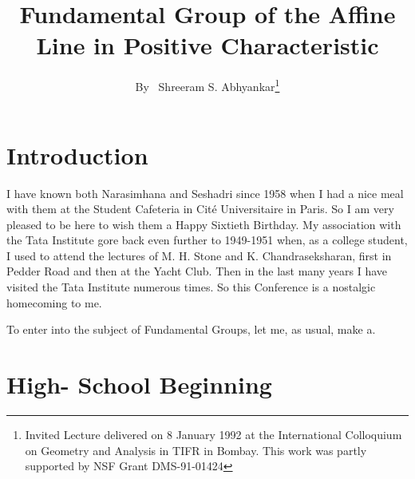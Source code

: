 \title{Fundamental Group of the Affine Line in Positive Characteristic}

\author{By~ Shreeram S. Abhyankar\footnote{Invited Lecture delivered on 8 January 1992 at the International Colloquium on Geometry and Analysis in TIFR in Bombay. This work was partly supported by NSF Grant DMS-91-01424}}

\date{}
\maketitle

\section{Introduction}\pageoriginale

I have known both Narasimhana and Seshadri since 1958 when I had a nice meal with them at the Student Cafeteria in Cit\'e Universitaire in Paris. So I am very pleased to be here to wish them a Happy Sixtieth Birthday. My association with the Tata Institute gore back even further to 1949-1951 when, as a college student, I used to attend the lectures of M. H. Stone and K. Chandraseksharan, first in Pedder Road and then at the Yacht Club. Then in the last many years I have visited the Tata Institute numerous times. So this Conference is a nostalgic homecoming to me.     

To enter into the subject of Fundamental Groups, let me, as usual, make a.

\section{High- School Beginning}

